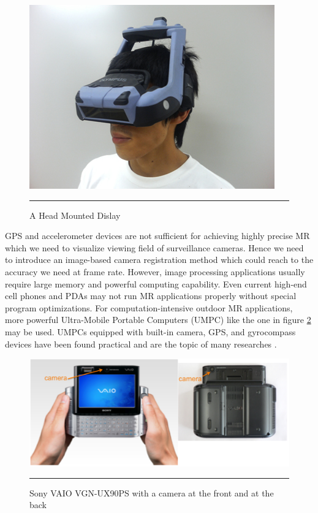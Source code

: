 \begin{figure}[htbp]
	\centering
	\includegraphics{./Primitives/hmd.jpg}
	\rule{35em}{0.5pt}
	\caption[Head Mounted Dislay]{A Head Mounted Dislay}
	\label{fig:HMD}
\end{figure}

GPS and accelerometer devices are not sufficient for achieving highly precise MR which we need to visualize viewing field of surveillance cameras. Hence we need to introduce an image-based camera registration method which could reach to the accuracy we need at frame rate. However, image processing applications usually require large memory and powerful computing capability. Even current high-end cell phones and PDAs may not run MR applications properly without special program optimizations. For computation-intensive outdoor MR applications, more powerful Ultra-Mobile Portable Computers (UMPC) like the one in figure \ref{fig:VAIO} may be used. UMPCs equipped with built-in camera, GPS, and gyrocompass devices have been found practical and are the topic of many researches \cite{Reference2} \cite{Reference4} \cite{Reference13}.

\begin{figure}[htbp]
	\centering
	\includegraphics[width=14cm]{./Primitives/vaio.png}
	\rule{35em}{0.5pt}
	\caption[Sony VAIO VGN-UX90PS]{Sony VAIO VGN-UX90PS with a camera at the front and at the back}
	\label{fig:VAIO}
\end{figure}

